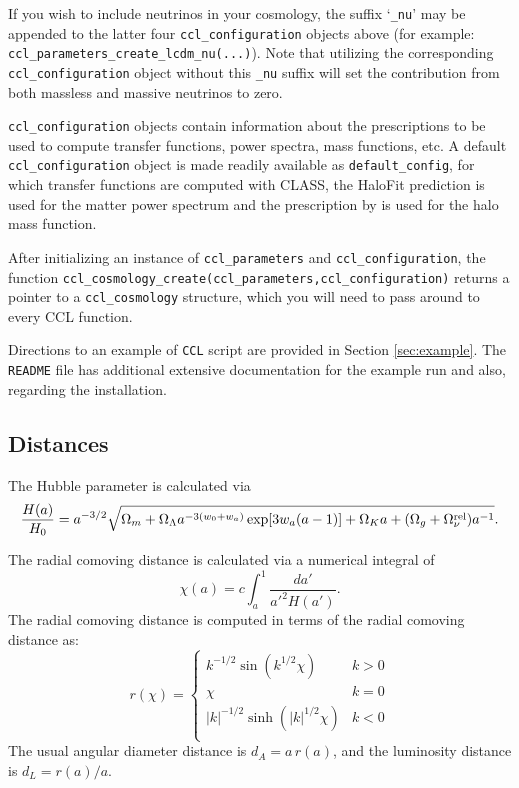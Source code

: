 \documentclass[\docopts]{\docclass}
\begin{document}
If you wish to include neutrinos in your cosmology, the suffix `{\tt \_nu}' may be appended to the latter four {\tt ccl\_configuration} objects above (for example: {\tt ccl\_parameters\_create\_lcdm\_nu(...)}). Note that utilizing the corresponding {\tt ccl\_configuration} object without this {\tt \_nu} suffix will set the contribution from both massless and massive neutrinos to zero.

{\tt ccl\_configuration} objects contain information about the prescriptions to be used to compute transfer functions, power spectra, mass functions, etc. A default {\tt ccl\_configuration} object is made readily available as {\tt default\_config}, for which transfer functions are computed with CLASS, the HaloFit prediction is used for the matter power spectrum and the prescription by \cite{Tinker2008} is used for the halo mass function.

After initializing an instance of {\tt ccl\_parameters} and {\tt ccl\_configuration}, the function {\tt ccl\_cosmology\_create(ccl\_parameters,ccl\_configuration)} returns a pointer to a {\tt ccl\_cosmology} structure, which you will need to pass around to every CCL function.

Directions to an example of {\tt CCL} script are provided in Section \ref{sec:example}. The {\tt README} file has additional extensive documentation for the example run and also, regarding the installation.

\subsection{Distances}
\label{sec:distances}

The Hubble parameter is calculated via
%
\begin{equation}
\frac{H(a)}{H_0} = a^{-3/2}\sqrt{\Omega_m+\Omega_\Lambda a^{-3(w_0+w_a)}
    \exp[3 w_a (a-1)]+\Omega_K a +(\Omega_g+\Omega_\nu^{\rm rel}) a^{-1}}.
\end{equation}

The radial comoving distance is calculated via a numerical integral of
\begin{equation}
 \chi(a)= c \int_a^1 \frac{da'}{a'^2 H(a')}.
\end{equation}
The radial comoving distance is computed in terms of the radial comoving distance as:
\begin{equation}\label{eq:angdist}
 r(\chi)=\left\{\begin{array}{cc}
                 k^{-1/2}\sin(k^{1/2}\chi) & k>0\\
                 \chi & k=0\\
                 |k|^{-1/2}\sinh(|k|^{1/2}\chi) & k<0\\
                \end{array}\right.
\end{equation}
The usual angular diameter distance is $d_A=a\,r(a)$, and the luminosity distance is
$d_L=r(a)/a$.
\end{document}
